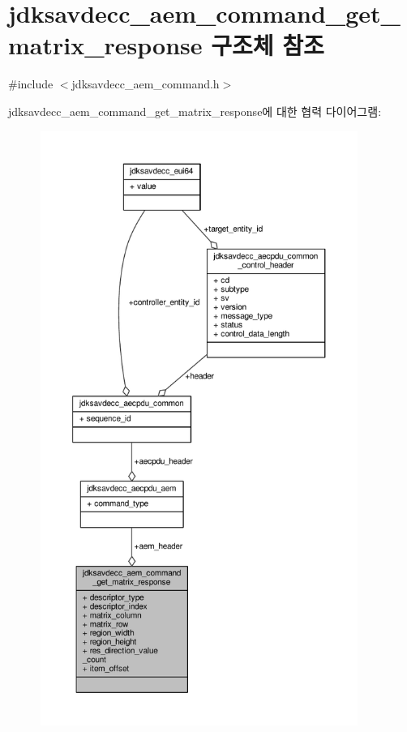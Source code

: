 \hypertarget{structjdksavdecc__aem__command__get__matrix__response}{}\section{jdksavdecc\+\_\+aem\+\_\+command\+\_\+get\+\_\+matrix\+\_\+response 구조체 참조}
\label{structjdksavdecc__aem__command__get__matrix__response}


{\ttfamily \#include $<$jdksavdecc\+\_\+aem\+\_\+command.\+h$>$}



jdksavdecc\+\_\+aem\+\_\+command\+\_\+get\+\_\+matrix\+\_\+response에 대한 협력 다이어그램\+:
\nopagebreak
\begin{figure}[H]
\begin{center}
\leavevmode
\includegraphics[height=550pt]{structjdksavdecc__aem__command__get__matrix__response__coll__graph}
\end{center}
\end{figure}
